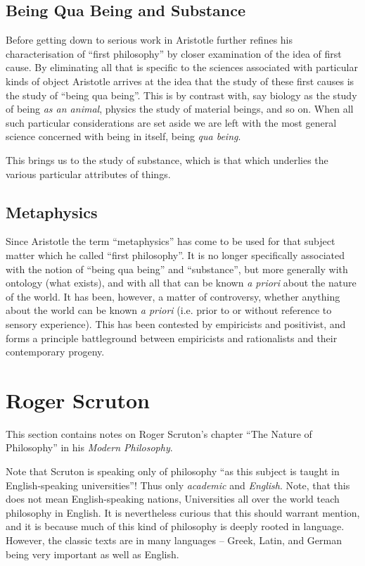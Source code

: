 \documentclass[10pt,titlepage]{article}
\begin{document}
\subsection{Being Qua Being and Substance}

Before getting down to serious work in Aristotle further refines his characterisation of ``first philosophy'' by closer examination of the idea of first cause.
By eliminating all that is specific to the sciences associated with particular kinds of object Aristotle arrives at the idea that the study of these first causes is the study of ``being qua being''.
This is by contrast with, say biology as the study of being \emph{as an animal}, physics the study of material beings, and so on.
When all such particular considerations are set aside we are left with the most general science concerned with being in itself, being \emph{qua being}.

This brings us to the study of substance, which is that which underlies the various particular attributes of things.

\subsection{Metaphysics}

Since Aristotle the term ``metaphysics'' has come to be used for that subject matter which he called ``first philosophy''.
It is no longer specifically associated with the notion of ``being qua being'' and ``substance'', but more generally with ontology (what exists), and with all that can be known \emph{a priori} about the nature of the world.
It has been, however, a matter of controversy, whether anything about the world can be known \emph{a priori} (i.e. prior to or without reference to sensory experience).
This has been contested by empiricists and positivist, and forms a principle battleground between empiricists and rationalists and their contemporary progeny.

\pagebreak
\section{Roger Scruton}

This section contains notes on Roger Scruton's chapter ``The Nature of Philosophy'' in his {\it Modern Philosophy}\cite{scruton97}.

Note that Scruton is speaking only of philosophy ``as this subject is taught in English-speaking universities''!
Thus only {\it academic} and {\it English}.
Note, that this does not mean English-speaking nations, Universities all over the world teach philosophy in English.
It is nevertheless curious that this should warrant mention, and it is because much of this kind of philosophy is deeply rooted in language.
However, the classic texts are in many languages -- Greek, Latin, and German being very important as well as English.
\end{document}

